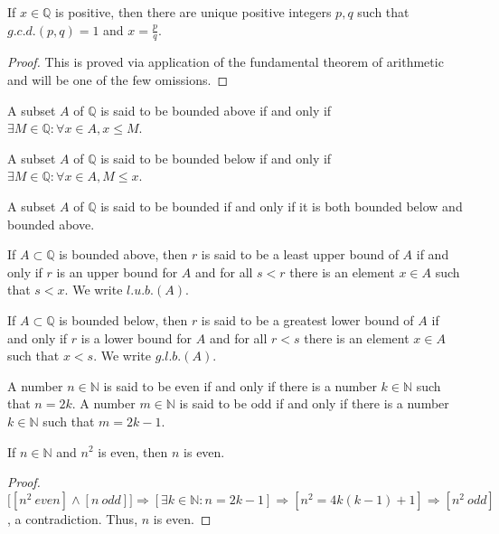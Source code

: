 \documentclass[crop=false,class=book]{standalone}
\begin{document}
\begin{theorem}
If $x\in \mathbb{Q}$ is positive, then there are unique positive integers $p, q$ such that $g.c.d.(p,q)=1$ and $x=\frac{p}{q}$.
\end{theorem}
\begin{proof}
This is proved via application of the fundamental theorem of arithmetic and will be one of the few omissions.
\end{proof}
\begin{definition}
A subset $A$ of $\mathbb{Q}$ is said to be bounded above if and only if $\exists M\in \mathbb{Q}: \forall x\in A,x \leq M$.
\end{definition}
\begin{definition}
A subset $A$ of $\mathbb{Q}$ is said to be bounded below if and only if $\exists M\in \mathbb{Q}:\forall x\in A,M\leq x$. 
\end{definition}
\begin{definition}
A subset $A$ of $\mathbb{Q}$ is said to be bounded if and only if it is both bounded below and bounded above.
\end{definition}
\begin{definition}
If $A\subset \mathbb{Q}$ is bounded above, then $r$ is said to be a least upper bound of $A$ if and only if $r$ is an upper bound for $A$ and for all $s<r$ there is an element $x\in A$ such that $s<x$. We write $l.u.b.(A)$.
\end{definition}
\begin{definition}
If $A\subset \mathbb{Q}$ is bounded below, then $r$ is said to be a greatest lower bound of $A$ if and only if $r$ is a lower bound for $A$ and for all $r<s$ there is an element $x\in A$ such that $x<s$. We write $g.l.b.(A)$.
\end{definition}
\begin{definition}
A number $n\in \mathbb{N}$ is said to be even if and only if there is a number $k\in \mathbb{N}$ such that $n=2k$. A number $m\in \mathbb{N}$ is said to be odd if and only if there is a number $k\in \mathbb{N}$ such that $m=2k-1$.
\end{definition}
\begin{lemma}
If $n\in \mathbb{N}$ and $n^2$ is even, then $n$ is even.
\end{lemma}
\begin{proof}
$\big[[n^2\ even]\land [n\ odd]\big]\Rightarrow [\exists k\in \mathbb{N}:n=2k-1]\Rightarrow [n^2 = 4k(k-1)+1]\Rightarrow [n^2\ odd]$, a contradiction. Thus, $n$ is even.
\end{proof}
\end{document}
